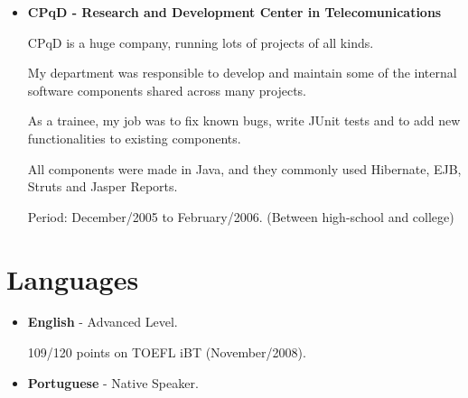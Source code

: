 \documentclass[a4paper,10pt]{article}
\begin{document}
\begin{itemize}
      \item
        \textbf{CPqD - Research and Development Center in Telecomunications}

        CPqD is a huge company, running lots of projects of all kinds.

        My department was responsible to develop and maintain some of the internal software components shared across many projects.

        As a trainee, my job was to fix known bugs, write JUnit tests and to add new functionalities to existing components.

        All components were made in Java, and they commonly used Hibernate, EJB, Struts and Jasper Reports.

        Period: December/2005 to February/2006. {\small(Between high-school and college)}
    \end{itemize}

  \section{Languages}
    \begin{itemize}
      \item  
        \textbf{English} - Advanced Level.

        109/120 points on TOEFL iBT (November/2008).

      \item  
        \textbf{Portuguese} - Native Speaker.
    \end{itemize}
\end{document}
